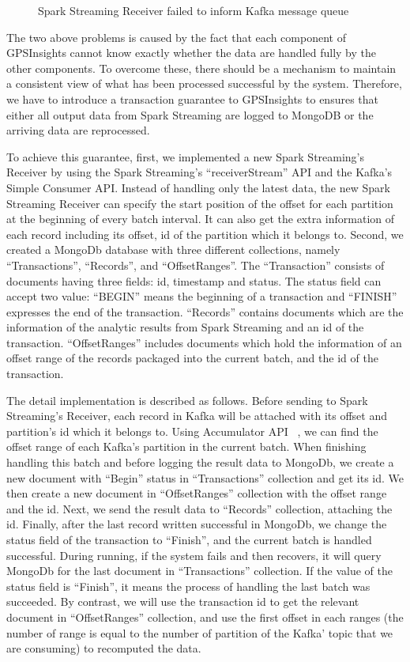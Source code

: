\documentclass{sig-alternate-05-2015}
\begin{document}
\begin{figure}[h]
\centering
{}
\caption{Spark Streaming Receiver failed to inform Kafka message queue}
\label{fig:second-problem}
\end{figure} 

The two above problems is caused by the fact that each component of GPSInsights cannot know exactly whether the data are handled fully by the other components. To overcome these, there should be a mechanism to maintain a consistent view of what has been processed successful by the system. Therefore, we have to introduce a transaction guarantee to GPSInsights to ensures that either all output data from Spark Streaming are logged to MongoDB or the arriving data are reprocessed.

To achieve this guarantee, first, we implemented a new Spark Streaming's Receiver by using the Spark Streaming's ``receiverStream'' API and the Kafka's Simple Consumer API. Instead of handling only the latest data, the new Spark Streaming Receiver can specify the start position of the offset for each partition at the beginning of every batch interval. It can also get the extra information of each record including its offset, id of the partition which it belongs to. Second, we created a MongoDb database with three different collections, namely ``Transactions'', ``Records'', and ``OffsetRanges''. The ``Transaction'' consists of documents having three fields: id, timestamp and status. The status field can accept two value: ``BEGIN'' means the beginning of a transaction and ``FINISH'' expresses the end of the transaction. ``Records'' contains documents which are the information of the analytic results from Spark Streaming and an id of the transaction. ``OffsetRanges'' includes documents which hold the information of an offset range of the records packaged into the current batch, and the id of the transaction.

The detail implementation is described as follows. Before sending to Spark Streaming's Receiver, each record in Kafka will be attached with its offset and partition's id which it belongs to. Using Accumulator API ~\cite{accumulatorapi}, we can find the offset range of each Kafka's partition in the current batch. When finishing handling this batch and before logging the result data to MongoDb, we create a new document with ``Begin'' status in ``Transactions'' collection and get its id. We then create a new document in ``OffsetRanges'' collection with the offset range and the id. Next, we send the result data to ``Records'' collection, attaching the id. Finally, after the last record written successful in MongoDb, we change the status field of the transaction to ``Finish'', and the current batch is handled successful. During running, if the system fails and then recovers, it will query MongoDb for the last document in ``Transactions'' collection.  If the value of the status field is ``Finish'', it means the process of handling the last batch was succeeded. By contrast, we will use the transaction id to get the relevant document in ``OffsetRanges'' collection, and use the first offset in each ranges (the number of range is equal to the number of partition of the Kafka' topic that we are consuming) to recomputed the data. 
\end{document}
